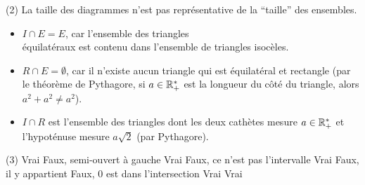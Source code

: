 \documentclass[a4paper,12pt]{report}
\begin{document}
\begin{core}
	\phantom{}
\begin{tasks}(2)
	\task La taille des diagrammes n'est pas représentative de la \enquote{taille} des ensembles.	

\begin{center}
\end{center}
\task 
\begin{itemize}
	\item $I\cap E=E$, car l'ensemble des triangles \\ équilatéraux est contenu dans l'ensemble de triangles isocèles. 
	\item $R\cap E=\emptyset$, car il n'existe aucun triangle qui est équilatéral et rectangle (par le théorème de Pythagore, si $a\in \mathbb R^*_+$ est la longueur du côté du triangle, alors $a^2+a^2\neq a^2$).
	\item $I\cap R$ est l'ensemble des triangles dont les deux cathètes mesure $a\in \mathbb R^*_+$ et l'hypoténuse mesure $a\sqrt{2}$ (par Pythagore).
\end{itemize}
\end{tasks}

\end{core}
\begin{core}
	\phantom{}
	\begin{tasks}(3)
		\task Vrai
		\task Faux, semi-ouvert à gauche
		\task Vrai
		\task Faux, ce n'est pas l'intervalle
		\task Vrai
		\task Faux, il y appartient
		\task Faux, $0$ est dans l'intersection
		\task Vrai
		\task Vrai
	\end{tasks}
\end{core}
\end{document}
